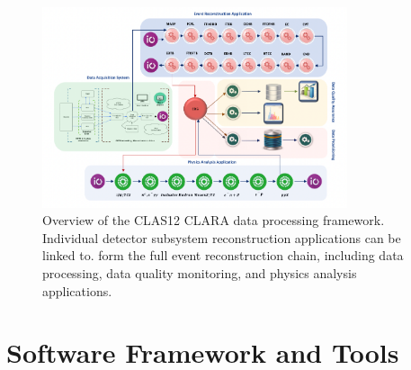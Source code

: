 \begin{figure}
\centering
\includegraphics[width=0.8\textwidth]{pics/clara-overview.pdf}
\caption{Overview of the CLAS12 CLARA data processing framework.  Individual detector subsystem reconstruction applications can be linked to. form the full event reconstruction chain, including  data processing, data quality monitoring, and physics analysis applications.}
\label{fig:clara-overview}
\end{figure}

\section{Software Framework and Tools}\label{sec:framework}


